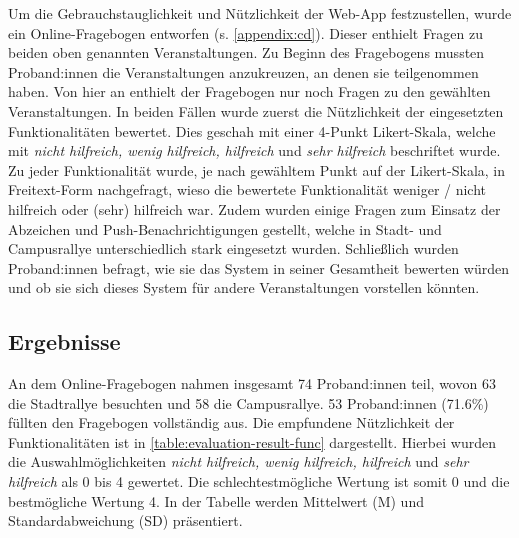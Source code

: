 Um die Gebrauchstauglichkeit und Nützlichkeit der Web-App festzustellen, wurde
ein Online-Fragebogen entworfen (s. \autoref{appendix:cd}). Dieser enthielt
Fragen zu beiden oben genannten Veranstaltungen. Zu Beginn des Fragebogens
mussten Proband:innen die Veranstaltungen anzukreuzen, an denen sie teilgenommen
haben. Von hier an enthielt der Fragebogen nur noch Fragen zu den gewählten
Veranstaltungen. In beiden Fällen wurde zuerst die Nützlichkeit der eingesetzten
Funktionalitäten bewertet. Dies geschah mit einer 4-Punkt Likert-Skala, welche
mit \textit{nicht hilfreich, wenig hilfreich, hilfreich} und \textit{sehr
    hilfreich} beschriftet wurde. Zu jeder Funktionalität wurde, je nach gewähltem
Punkt auf der Likert-Skala, in Freitext-Form nachgefragt, wieso die bewertete
Funktionalität weniger / nicht hilfreich oder (sehr) hilfreich war. Zudem wurden
einige Fragen zum Einsatz der Abzeichen und Push-Benachrichtigungen gestellt,
welche in Stadt- und Campusrallye unterschiedlich stark eingesetzt wurden.
Schließlich wurden Proband:innen befragt, wie sie das System in seiner
Gesamtheit bewerten würden und ob sie sich dieses System für andere
Veranstaltungen vorstellen könnten.


\subsection{Ergebnisse}

An dem Online-Fragebogen nahmen insgesamt 74 Proband:innen teil, wovon 63 die
Stadtrallye besuchten und 58 die Campusrallye. 53 Proband:innen (71.6\%) füllten
den Fragebogen vollständig aus. Die empfundene Nützlichkeit der Funktionalitäten
ist in \autoref{table:evaluation-result-func} dargestellt. Hierbei wurden die
Auswahlmöglichkeiten \textit{nicht hilfreich, wenig hilfreich, hilfreich} und
\textit{sehr hilfreich} als 0 bis 4 gewertet. Die schlechtestmögliche Wertung
ist somit 0 und die bestmögliche Wertung 4. In der Tabelle werden Mittelwert (M)
und Standardabweichung (SD) präsentiert.


